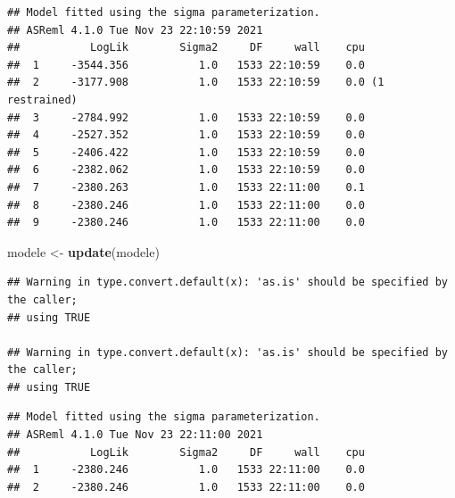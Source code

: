 \documentclass[
  12pt,
]{book}
\newenvironment{Shaded}{\begin{snugshade}}{\end{snugshade}}
\newcommand{\KeywordTok}[1]{\textcolor[rgb]{0.13,0.29,0.53}{\textbf{#1}}}
\newcommand{\NormalTok}[1]{#1}
\newcommand{\OperatorTok}[1]{\textcolor[rgb]{0.81,0.36,0.00}{\textbf{#1}}}
\newcommand{\StringTok}[1]{\textcolor[rgb]{0.31,0.60,0.02}{#1}}
\begin{document}
\begin{verbatim}
## Model fitted using the sigma parameterization.
## ASReml 4.1.0 Tue Nov 23 22:10:59 2021
##           LogLik        Sigma2     DF     wall    cpu
##  1     -3544.356           1.0   1533 22:10:59    0.0
##  2     -3177.908           1.0   1533 22:10:59    0.0 (1 restrained)
##  3     -2784.992           1.0   1533 22:10:59    0.0
##  4     -2527.352           1.0   1533 22:10:59    0.0
##  5     -2406.422           1.0   1533 22:10:59    0.0
##  6     -2382.062           1.0   1533 22:10:59    0.0
##  7     -2380.263           1.0   1533 22:11:00    0.1
##  8     -2380.246           1.0   1533 22:11:00    0.0
##  9     -2380.246           1.0   1533 22:11:00    0.0
\end{verbatim}

\begin{Shaded}
\begin{Highlighting}[]
\NormalTok{modele \textless{}{-}}\StringTok{ }\KeywordTok{update}\NormalTok{(modele)}
\end{Highlighting}
\end{Shaded}

\begin{verbatim}
## Warning in type.convert.default(x): 'as.is' should be specified by the caller;
## using TRUE

## Warning in type.convert.default(x): 'as.is' should be specified by the caller;
## using TRUE
\end{verbatim}

\begin{verbatim}
## Model fitted using the sigma parameterization.
## ASReml 4.1.0 Tue Nov 23 22:11:00 2021
##           LogLik        Sigma2     DF     wall    cpu
##  1     -2380.246           1.0   1533 22:11:00    0.0
##  2     -2380.246           1.0   1533 22:11:00    0.0
\end{verbatim}

\begin{Shaded}
\end{Shaded}
\end{document}
